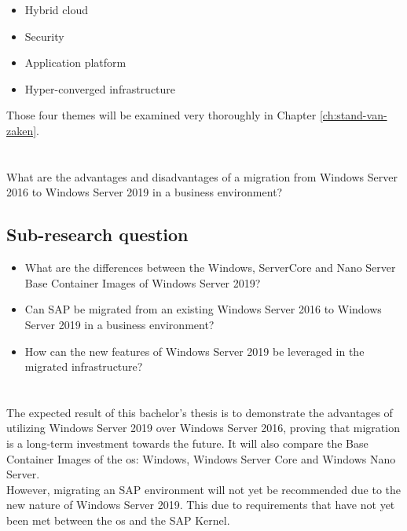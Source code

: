 \begin{itemize}
	\item Hybrid cloud
	\item Security
	\item Application platform
	\item Hyper-converged infrastructure
\end{itemize}

Those four themes will be examined very thoroughly in Chapter \ref{ch:stand-van-zaken}.

\section{}
\label{sec:onderzoeksvraag}
What are the advantages and disadvantages of a migration from Windows Server 2016 to Windows Server 2019 in a business environment?

\subsection{Sub-research question}

\begin{itemize}
	\item What are the differences between the Windows, ServerCore and Nano Server Base Container Images of Windows Server 2019?
	\item Can SAP be migrated from an existing Windows Server 2016 to Windows Server 2019 in a business environment?
	\item How can the new features of Windows Server 2019 be leveraged in the migrated infrastructure? 
\end{itemize}

\section{}
\label{sec:onderzoeksdoelstelling}

The expected result of this bachelor's thesis is to demonstrate the advantages of utilizing Windows Server 2019 over Windows Server 2016, proving that migration is a long-term investment towards the future. 
It will also compare the Base Container Images of the \acrshort{os}: Windows, Windows Server Core and Windows Nano Server. \\
However, migrating an SAP environment will not yet be recommended due to the new nature of Windows Server 2019. 
This due to requirements that have not yet been met between the \acrshort{os} and the SAP Kernel. 

